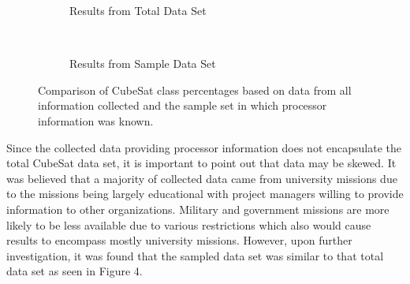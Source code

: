 \documentclass[11pt]{article}
\begin{document}
\begin{figure}[h!]\label{pieclasses}
    \centering
    \begin{subfigure}[t]{0.5\textwidth}
        \centering
        \caption{Results from Total Data Set}
    \end{subfigure}%
    ~ 
    \begin{subfigure}[t]{0.5\textwidth}
        \centering
        \caption{Results from Sample Data Set}
    \end{subfigure}
    \caption{Comparison of CubeSat class percentages based on data from all information collected and the sample set in which processor information was known.}
\end{figure}

Since the collected data providing processor information does not encapsulate the total CubeSat data set, it is important to point out that data may be skewed.  It was believed that a majority of collected data came from university missions due to the missions being largely educational with project managers willing to provide information to other organizations.  Military and government missions are more likely to be less available due to various restrictions which also would cause results to encompass mostly university missions.  However, upon further investigation, it was found that the sampled data set was similar to that total data set as seen in Figure 4. 
\end{document}
